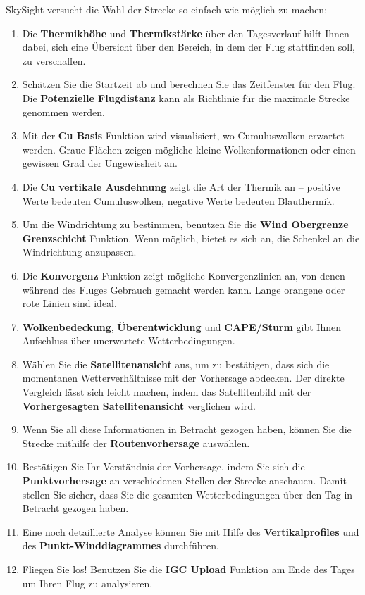 \documentclass[9pt,a4paper,twocolumn]{article}
\begin{document}
SkySight versucht die Wahl der Strecke so einfach wie möglich zu machen:

\begin{enumerate}
  \item Die \textbf{Thermikhöhe} und \textbf{Thermikstärke} über den Tagesverlauf hilft Ihnen dabei, sich eine Übersicht über den Bereich, in dem der Flug stattfinden soll, zu verschaffen.
  \item Schätzen Sie die Startzeit ab und berechnen Sie das Zeitfenster für den Flug. Die \textbf{Potenzielle Flugdistanz} kann als Richtlinie für die maximale Strecke genommen werden. 
    \item Mit der \textbf{Cu Basis} Funktion wird visualisiert, wo Cumuluswolken erwartet werden. Graue Flächen zeigen mögliche kleine Wolkenformationen oder einen gewissen Grad der Ungewissheit an.
\item Die \textbf{Cu vertikale Ausdehnung} zeigt die Art der Thermik an – positive Werte bedeuten Cumuluswolken, negative Werte bedeuten Blauthermik.
  \item Um die Windrichtung zu bestimmen, benutzen Sie die \textbf{Wind Obergrenze Grenzschicht} Funktion. Wenn möglich, bietet es sich an, die Schenkel an die Windrichtung anzupassen.
\item Die \textbf{Konvergenz} Funktion zeigt mögliche Konvergenzlinien an, von denen während des Fluges Gebrauch gemacht werden kann. Lange orangene oder rote Linien sind ideal.
  \item \textbf{Wolkenbedeckung}, \textbf{Überentwicklung} und \textbf{CAPE/Sturm} gibt Ihnen Aufschluss über unerwartete Wetterbedingungen.
\item Wählen Sie die \textbf{Satellitenansicht} aus, um zu bestätigen, dass sich die momentanen Wetterverhältnisse mit der Vorhersage abdecken. Der direkte Vergleich lässt sich leicht machen, indem das Satellitenbild mit der \textbf{Vorhergesagten Satellitenansicht} verglichen wird.
  \item Wenn Sie all diese Informationen in Betracht gezogen haben, können Sie die Strecke mithilfe der \textbf{Routenvorhersage} auswählen.
  \item Bestätigen Sie Ihr Verständnis der Vorhersage, indem Sie sich die \textbf{Punktvorhersage} an verschiedenen Stellen der Strecke anschauen. Damit stellen Sie sicher, dass Sie die gesamten Wetterbedingungen über den Tag in Betracht gezogen haben.
\item Eine noch detaillierte Analyse können Sie mit Hilfe des \textbf{Vertikalprofiles} und des \textbf{Punkt-Winddiagrammes} durchführen.
  \item Fliegen Sie los! Benutzen Sie die \textbf{IGC Upload} Funktion am Ende des Tages um Ihren Flug zu analysieren.
\end{enumerate}
\end{document}
